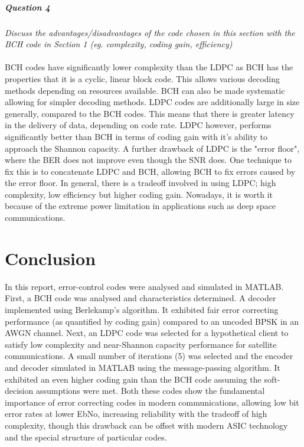 \documentclass[a4paper]{article}
\begin{document}
\subsubsection{Question 4} \textit{Discuss the advantages/disadvantages of the code chosen in this section with the BCH code in Section 1 (eg. complexity, coding gain, efficiency)}\\
\\
BCH codes have significantly lower complexity than the LDPC as BCH has the properties that it is a cyclic, linear block code. This allows various decoding methods depending on resources available. BCH can also be made systematic allowing for simpler decoding methods. LDPC codes are additionally large in size generally, compared to the BCH codes. This means that there is greater latency in the delivery of data, depending on code rate. LDPC however, performs significantly better than BCH in terms of coding gain with it's ability to approach the Shannon capacity. A further drawback of LDPC is the "error floor", where the BER does not improve even though the SNR does. One technique to fix this is to concatenate LDPC and BCH, allowing BCH to fix errors caused by the error floor. In general, there is a tradeoff involved in using LDPC; high complexity, low efficiency but higher coding gain. Nowadays, it is worth it because of the extreme power limitation in applications such as deep space communications.

\part*{Conclusion}
In this report, error-control codes were analysed and simulated in MATLAB. First, a BCH code was analysed and characteristics determined.   A decoder implemented using Berlekamp's algorithm. It exhibited fair error correcting performance (as quantified by coding gain) compared to an uncoded BPSK in an AWGN channel. Next, an LDPC code was selected for a hypothetical client to satisfy low complexity and near-Shannon capacity performance for satellite communications. A small number of iterations (5) was selected and the encoder and decoder simulated in MATLAB using the message-passing algorithm. It exhibited an even higher coding gain than the BCH code assuming the soft-decision assumptions were met. Both these codes show the fundamental importance of error correcting codes in modern communications, allowing low bit error rates at lower EbNo, increasing reliability with the tradeoff of high complexity, though this drawback can be offset with modern ASIC technology and the special structure of particular codes. 
\end{document}
